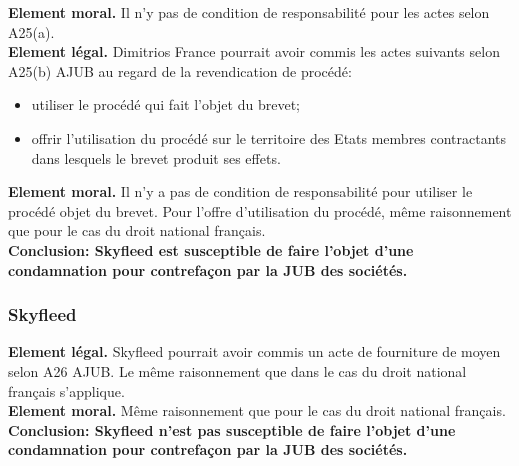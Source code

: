 \textbf{Element moral.} Il n'y pas de condition de responsabilité pour les actes selon A25(a).\\

\textbf{Element légal.} Dimitrios France pourrait avoir commis les actes suivants selon A25(b) AJUB
au regard de la revendication de procédé:
\begin{itemize}
    \item utiliser le procédé qui fait l'objet du brevet;
    \item offrir l'utilisation du procédé sur le territoire des Etats membres contractants dans lesquels
    le brevet produit ses effets.\\
\end{itemize}

\textbf{Element moral.} Il n'y a pas de condition de responsabilité pour utiliser le procédé objet du brevet.
Pour l'offre d'utilisation du procédé, même raisonnement que pour le cas du droit national français.\\

\textbf{Conclusion: Skyfleed est susceptible de faire l'objet d'une condamnation pour contrefaçon
par la JUB des sociétés.}

\subsubsection{Skyfleed}

\textbf{Element légal.} Skyfleed pourrait avoir commis un acte de fourniture de moyen selon A26 AJUB.
Le même raisonnement que dans le cas du droit national français s'applique.\\

\textbf{Element moral.} Même raisonnement que pour le cas du droit national français.\\

\textbf{Conclusion: Skyfleed n'est pas susceptible de faire l'objet d'une condamnation pour contrefaçon
par la JUB des sociétés.}